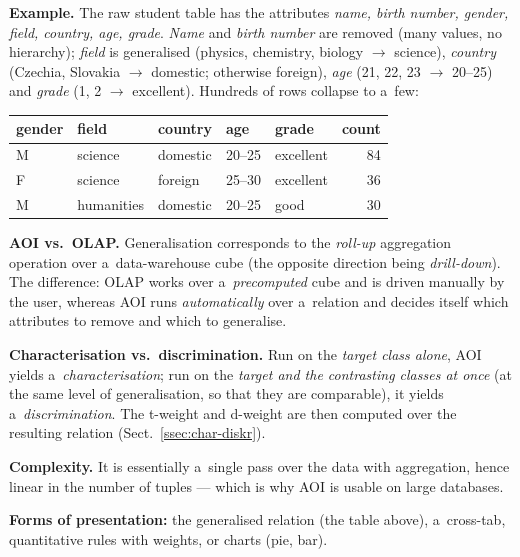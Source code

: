 \documentclass[11pt,a4paper]{article}
\theoremstyle{definition}
\begin{document}
\medskip
\noindent\textbf{Example.} The raw student table has the attributes
\emph{name, birth number, gender, field, country, age, grade}.
\emph{Name} and \emph{birth number} are removed (many values, no hierarchy);
\emph{field} is generalised (physics, chemistry, biology $\to$ science),
\emph{country} (Czechia, Slovakia $\to$ domestic; otherwise foreign),
\emph{age} (21, 22, 23 $\to$ 20--25) and \emph{grade} (1, 2 $\to$ excellent).
Hundreds of rows collapse to a~few:

\begin{center}\small
\begin{tabular}{lllll r}
\toprule
\textbf{gender} & \textbf{field} & \textbf{country} & \textbf{age} & \textbf{grade}
  & \textbf{count} \\
\midrule
M & science   & domestic & 20--25 & excellent & 84 \\
F & science   & foreign  & 25--30 & excellent & 36 \\
M & humanities & domestic & 20--25 & good      & 30 \\
\bottomrule
\end{tabular}
\end{center}

\begin{poznbox}
\textbf{AOI vs.\ OLAP.} Generalisation corresponds to the \emph{roll-up} aggregation operation
over a~data-warehouse cube (the opposite direction being \emph{drill-down}). The difference:
OLAP works over a~\emph{precomputed} cube and is driven manually by the user, whereas AOI runs
\emph{automatically} over a~relation and decides itself which attributes to remove and which to
generalise.

\textbf{Characterisation vs.\ discrimination.} Run on the \emph{target class alone}, AOI yields
a~\emph{characterisation}; run on the \emph{target and the contrasting classes at once} (at the
same level of generalisation, so that they are comparable), it yields a~\emph{discrimination}.
The t-weight and d-weight are then computed over the resulting relation
(Sect.~\ref{ssec:char-diskr}).

\textbf{Complexity.} It is essentially a~single pass over the data with aggregation, hence
linear in the number of tuples --- which is why AOI is usable on large databases.

\textbf{Forms of presentation:} the generalised relation (the table above), a~cross-tab,
quantitative rules with weights, or charts (pie, bar).
\end{poznbox}
\end{document}
